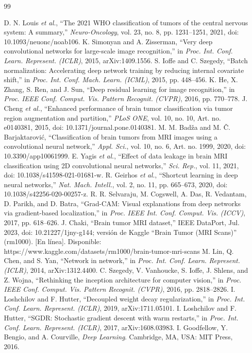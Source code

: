 \documentclass[letterpaper, 10 pt, conference]{ieeeconf}  %
\begin{document}
\begin{thebibliography}{99}

 D. N. Louis \textit{et al.}, ``The 2021 WHO classification of tumors of the central nervous system: A summary,'' \textit{Neuro-Oncology}, vol. 23, no. 8, pp. 1231--1251, 2021, doi: 10.1093/neuonc/noab106.
 K. Simonyan and A. Zisserman, ``Very deep convolutional networks for large-scale image recognition,'' in \textit{Proc. Int. Conf. Learn. Represent. (ICLR)}, 2015, arXiv:1409.1556.
 S. Ioffe and C. Szegedy, ``Batch normalization: Accelerating deep network training by reducing internal covariate shift,'' in \textit{Proc. Int. Conf. Mach. Learn. (ICML)}, 2015, pp. 448--456.
 K. He, X. Zhang, S. Ren, and J. Sun, ``Deep residual learning for image recognition,'' in \textit{Proc. IEEE Conf. Comput. Vis. Pattern Recognit. (CVPR)}, 2016, pp. 770--778.
 J. Cheng \textit{et al.}, ``Enhanced performance of brain tumor classification via tumor region augmentation and partition,'' \textit{PLoS ONE}, vol. 10, no. 10, Art. no. e0140381, 2015, doi: 10.1371/journal.pone.0140381.
 M. M. Badža and M. Č. Barjaktarović, ``Classification of brain tumors from MRI images using a convolutional neural network,'' \textit{Appl. Sci.}, vol. 10, no. 6, Art. no. 1999, 2020, doi: 10.3390/app10061999.
 E. Yagis \textit{et al.}, ``Effect of data leakage in brain MRI classification using 2D convolutional neural networks,'' \textit{Sci. Rep.}, vol. 11, 2021, doi: 10.1038/s41598-021-01681-w.
 R. Geirhos \textit{et al.}, ``Shortcut learning in deep neural networks,'' \textit{Nat. Mach. Intell.}, vol. 2, no. 11, pp. 665--673, 2020, doi: 10.1038/s42256-020-00257-z.
 R. R. Selvaraju, M. Cogswell, A. Das, R. Vedantam, D. Parikh, and D. Batra, ``Grad-CAM: Visual explanations from deep networks via gradient-based localization,'' in \textit{Proc. IEEE Int. Conf. Comput. Vis. (ICCV)}, 2017, pp. 618--626.
 J. Chaki, ``Brain tumor MRI dataset,'' IEEE DataPort, Jul. 2023, doi: 10.21227/1jny-g144; versión de Kaggle ``Brain Tumor (MRI Scans)'' (rm1000). [En línea]. Disponible: https://www.kaggle.com/datasets/rm1000/brain-tumor-mri-scans
 M. Lin, Q. Chen, and S. Yan, ``Network in network,'' in \textit{Proc. Int. Conf. Learn. Represent. (ICLR)}, 2014, arXiv:1312.4400.
 C. Szegedy, V. Vanhoucke, S. Ioffe, J. Shlens, and Z. Wojna, ``Rethinking the inception architecture for computer vision,'' in \textit{Proc. IEEE Conf. Comput. Vis. Pattern Recognit. (CVPR)}, 2016, pp. 2818--2826.
 I. Loshchilov and F. Hutter, ``Decoupled weight decay regularization,'' in \textit{Proc. Int. Conf. Learn. Represent. (ICLR)}, 2019, arXiv:1711.05101.
 I. Loshchilov and F. Hutter, ``SGDR: Stochastic gradient descent with warm restarts,'' in \textit{Proc. Int. Conf. Learn. Represent. (ICLR)}, 2017, arXiv:1608.03983.
 I. Goodfellow, Y. Bengio, and A. Courville, \textit{Deep Learning}. Cambridge, MA, USA: MIT Press, 2016.

\end{thebibliography}
\end{document}
